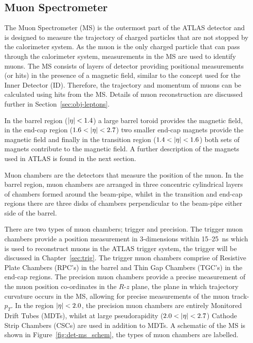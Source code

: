 \subsection{Muon Spectrometer}
\label{sec:det-MS}

The Muon Spectrometer (MS) is the outermost part of the ATLAS detector and is designed to measure the trajectory
of charged particles that are not stopped by the calorimeter system.
As the muon is the only charged particle that can pass through the calorimeter system,
measurements in the MS are used to identify muons.
The MS consists of layers of detector providing positional measurements (or hits)
in the presence of a magnetic field, similar to the concept used for the Inner Detector (ID).
Therefore, the trajectory and momentum of muons can be calculated using hits from the MS.
Details of muon reconstruction are discussed further in Section~\ref{sec:obj-leptons}.

In the barrel region ($|\eta|\nobreak<\nobreak1.4$) a large barrel toroid provides the magnetic field,
in the end-cap region ($1.6\nobreak<\nobreak|\eta|\nobreak<\nobreak2.7$) two smaller end-cap magnets  provide the magnetic field
and finally in the transition region ($1.4\nobreak<\nobreak|\eta|\nobreak<\nobreak1.6$) both sets of magnets contribute to the magnetic field.
A further description of the magnets used in ATLAS is found in the next section. 

Muon chambers are the detectors that measure the position of the muon.
In the barrel region,  muon chambers are arranged in three concentric cylindrical layers of chambers formed around the beam-pipe,
whilst in the transition and end-cap regions there are three disks of chambers perpendicular to the beam-pipe either side of the barrel.

There are two types of muon chambers; trigger and precision.
The trigger muon chambers provide a position measurement in 3-dimensions within 15--\SI{25}{\nano\second} which is used to reconstruct muons in the ATLAS trigger system,
the trigger will be discussed in Chapter~\ref{sec:trig}.
The trigger muon chambers comprise of Resistive Plate Chambers (RPC’s) in the barrel 
and Thin Gap Chambers (TGC’s) in the end-cap regions.
The precision muon chambers provide a precise measurement of the muon position co-ordinates in the $R$-$z$ plane,
the plane in which trajectory curvature occurs in the MS, allowing for precise measurements of the muon track-$p_T$. 
In the region $|\eta|\nobreak<\nobreak2.0$, the precision muon chambers are entirely Monitored Drift Tubes (MDTs),
whilst at large pseudorapidity ($2.0\nobreak<\nobreak|\eta|\nobreak<\nobreak2.7$) Cathode Strip Chambers (CSCs) are used in addition to MDTs.
A schematic of the MS is shown in Figure~\ref{fig:det-ms_schem}, the types of muon chambers are labelled.

